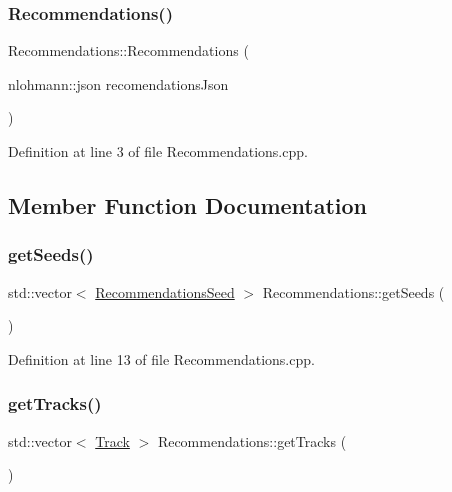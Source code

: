 \subsubsection{\texorpdfstring{Recommendations()}{Recommendations()}}
{\footnotesize\ttfamily Recommendations\+::\+Recommendations (\begin{DoxyParamCaption}\item[{nlohmann\+::json}]{recomendations\+Json }\end{DoxyParamCaption})}



Definition at line 3 of file Recommendations.\+cpp.



\subsection{Member Function Documentation}
\mbox{\label{class_recommendations_ab52386411dd0106999f96644a2b748ed}} 
\subsubsection{\texorpdfstring{get\+Seeds()}{getSeeds()}}
{\footnotesize\ttfamily std\+::vector$<$ \mbox{\hyperlink{class_recommendations_seed}{Recommendations\+Seed}} $>$ Recommendations\+::get\+Seeds (\begin{DoxyParamCaption}{ }\end{DoxyParamCaption})}



Definition at line 13 of file Recommendations.\+cpp.

\mbox{\label{class_recommendations_aceffb86a41f8e50b85e65277e2bcd45d}} 
\subsubsection{\texorpdfstring{get\+Tracks()}{getTracks()}}
{\footnotesize\ttfamily std\+::vector$<$ \mbox{\hyperlink{class_track}{Track}} $>$ Recommendations\+::get\+Tracks (\begin{DoxyParamCaption}{ }\end{DoxyParamCaption})}



